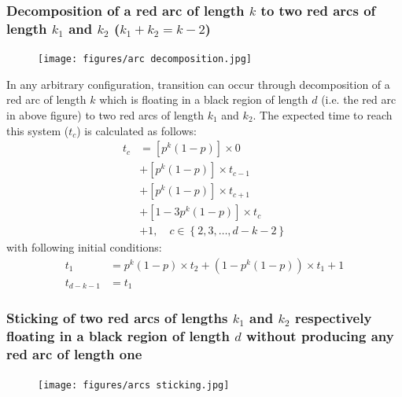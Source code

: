 \documentclass[]{book}
\theoremstyle{definition}
\begin{document}
\subsubsection{Decomposition of a red arc of length $k$ to two red arcs of length $k_1$ and $k_2$ ($k_1 + k_2 = k - 2$)}
\begin{figure}[H]
    \centering\texttt{[image: figures/arc decomposition.jpg]}
    \caption{}
\end{figure}
In any arbitrary configuration, transition can occur through decomposition of a red arc of length $k$ which is floating in a black region of length $d$ (i.e. the red arc in above figure) to two red arcs of length $k_1$ and $k_2$. The expected time to reach this system ($t_c$) is calculated as follows:
\begin{equation}
\begin{split}
    t_c &= \left[ p^k\left( 1-p \right) \right] \times 0 \\
    &+ \left[ p^k\left( 1-p \right) \right] \times t_{c-1} \\
    &+ \left[ p^k\left( 1-p \right) \right] \times t_{c+1} \\
    &+ \left[1 - 3p^k\left( 1-p \right) \right] \times t_c \\
    &+ 1, \quad c \in \left\{2, 3, \hdots, d-k-2 \right\}
\end{split}
\end{equation}
with following initial conditions:
\begin{equation}
\begin{split}
    t_1 &= p^k\left( 1-p \right) \times t_2 + \left( 1-p^k\left( 1-p \right) \right) \times t_1 + 1 \\
    t_{d-k-1} &= t_1
\end{split}
\end{equation}

\subsubsection{Sticking of two red arcs of lengths $k_1$ and $k_2$ respectively floating in a black region of length $d$ without producing any red arc of length one }
\begin{figure}[H]
    \centering\texttt{[image: figures/arcs sticking.jpg]}
    \caption{}
\end{figure}
\end{document}
